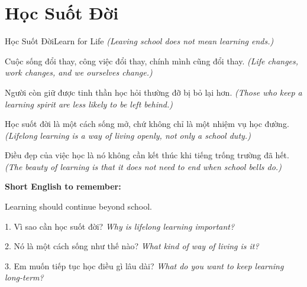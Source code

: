 \section{Học Suốt Đời}
\begin{truyen}{Học Suốt Đời}{Learn for Life}
\textit{(Leaving school does not mean learning ends.)}

Cuộc sống đổi thay, công việc đổi thay, chính mình cũng đổi thay.
\textit{(Life changes, work changes, and we ourselves change.)}

Người còn giữ được tinh thần học hỏi thường đỡ bị bỏ lại hơn.
\textit{(Those who keep a learning spirit are less likely to be left behind.)}

Học suốt đời là một cách sống mở, chứ không chỉ là một nhiệm vụ học đường.
\textit{(Lifelong learning is a way of living openly, not only a school duty.)}
\end{truyen}

\begin{baihoc}
Điều đẹp của việc học là nó không cần kết thúc khi tiếng trống trường đã hết.
\textit{(The beauty of learning is that it does not need to end when school bells do.)}
\end{baihoc}

\begin{ghinhoanh}
\textbf{Short English to remember:}

Learning should continue beyond school.

\end{ghinhoanh}

\begin{tuhocnhanh}
1. Vì sao cần học suốt đời? \textit{Why is lifelong learning important?}

2. Nó là một cách sống như thế nào? \textit{What kind of way of living is it?}

3. Em muốn tiếp tục học điều gì lâu dài? \textit{What do you want to keep learning long-term?}
\end{tuhocnhanh}
\ngancach